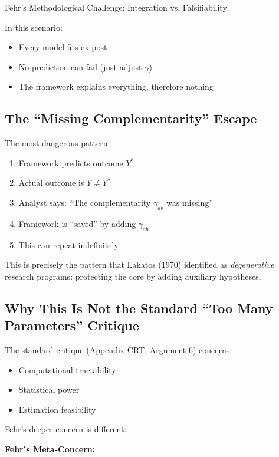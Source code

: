 \begin{chapter}{Fehr's Methodological Challenge: Integration vs. Falsifiability}
\begin{tcolorbox}[colback=red!10!white,colframe=red!75!black,title=\textbf{Fehr's Nightmare}]
In this scenario:
\begin{itemize}[noitemsep]
    \item Every model fits ex post
    \item No prediction can fail (just adjust $\gamma$)
    \item The framework explains everything, therefore nothing
\end{itemize}
\end{tcolorbox}

\subsection{The ``Missing Complementarity'' Escape}

The most dangerous pattern:

\begin{enumerate}
    \item Framework predicts outcome $Y^*$
    \item Actual outcome is $Y \neq Y^*$
    \item Analyst says: ``The complementarity $\gamma_{ab}$ was missing''
    \item Framework is ``saved'' by adding $\gamma_{ab}$
    \item This can repeat indefinitely
\end{enumerate}

This is precisely the pattern that Lakatos (1970) identified as \textit{degenerative} research programs: protecting the core by adding auxiliary hypotheses.

\subsection{Why This Is Not the Standard ``Too Many Parameters'' Critique}

The standard critique (Appendix CRT, Argument 6) concerns:
\begin{itemize}[noitemsep]
    \item Computational tractability
    \item Statistical power
    \item Estimation feasibility
\end{itemize}

Fehr's deeper concern is different:

\begin{tcolorbox}[colback=gray!10!white,colframe=gray!75!black]
\textbf{Fehr's Meta-Concern:}


\end{tcolorbox}
\end{chapter}
